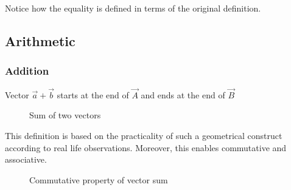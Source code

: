 \begin{note}
    Notice how the equality is defined in terms of the original definition.
\end{note}

\subsection{Arithmetic}%
\label{sub:vector-arithmetic}

\subsubsection{Addition}%
\label{ssub:vector-addition}

\begin{definition}
        Vector $\vec{a}+\vec{b}$ starts at the end of $\vec{A}$ and ends at the end of $\vec{B}$
\end{definition}

\begin{figure}[H]
    \begin{center}
    \end{center}
    \caption{Sum of two vectors}%
    \label{fig:vector-sum}
\end{figure}


This definition is based on the practicality of such a geometrical construct according to real life observations. Moreover, this enables commutative and associative.

\begin{figure}[htpb]
    \begin{center}
    \end{center}
    \caption{Commutative property of vector sum}%
    \label{fig:vector-sum-commutative}
\end{figure}

